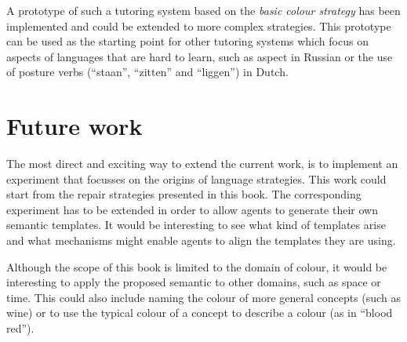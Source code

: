 A prototype of such a tutoring system based on the \emph{basic colour
  strategy} has been implemented and could be extended to more complex
strategies. This prototype can be used as the starting point for  other tutoring
systems which focus on aspects of languages that are hard to learn,
such as aspect in Russian or the use of posture verbs (``staan'', ``zitten'' and
``liggen'') in Dutch.

\section{Future work}
\label{s:future-work}

The most direct and exciting way to extend the current work, is to
implement an experiment that focusses on the origins of language
strategies. This work could start from the repair strategies presented
in this book. The corresponding experiment has to be extended
in order to allow agents to generate their own semantic templates. 
It would be interesting to
see what kind of templates arise and what mechanisms might enable
agents to align the templates they are using.

Although the scope of this book is limited to the domain of colour,
it would be interesting to apply the proposed semantic to other
domains, such as space or time. This could also include naming the
colour of more general concepts (such as wine) or to use the typical
colour of a concept to describe a colour (as in ``blood red'').